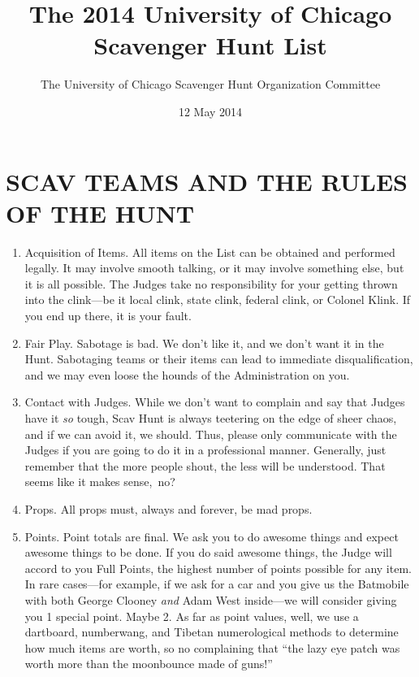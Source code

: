 \documentclass{book}
\title{The 2014 University of Chicago Scavenger Hunt List}
\author{The University of Chicago Scavenger Hunt Organization Committee}
\date{12 May 2014}
\begin{document}
\pagestyle{empty}
\maketitle



\section*{SCAV TEAMS AND THE RULES OF THE HUNT}

\begin{enumerate}

\item Acquisition of Items. All items on the List can be obtained and performed legally. It may involve smooth talking, or it may involve something else, but it is all possible. The Judges take no responsibility for your getting thrown into the clink---be it local clink, state clink, federal clink, or Colonel Klink. If you end up there, it is your fault. 

\item Fair Play. Sabotage is bad. We don't like it, and we don't want
   it in the Hunt. Sabotaging teams or their items can lead to immediate
   disqualification, and we may even loose the hounds of the Administration on you.
   
\item Contact with Judges. While we don't want to complain and say
   that Judges have it \emph{so} tough, Scav Hunt is always teetering on the edge
   of sheer chaos, and if we can avoid it, we should. Thus, please
   only communicate with the Judges if you are going to do it in a
   professional manner. Generally, just remember that the more people shout,
   the less will be understood. That seems like it makes sense,~no?

\item Props. All props must, always and forever, be mad props.

\item Points. Point totals are final. We ask you to do awesome things and expect awesome things to be done. If you do said awesome things, the Judge will accord to you Full Points, the highest number of points possible for any item. In rare cases---for example, if we ask for a car and you give us the Batmobile with both George Clooney \emph{and} Adam West inside---we will consider giving you 1 special point. Maybe 2. As far as point values, well, we use a dartboard, numberwang, and Tibetan numerological methods to determine how much items are worth, so no complaining that ``the lazy eye patch was worth more than the moonbounce made of guns!''


\end{enumerate}
\end{document}

